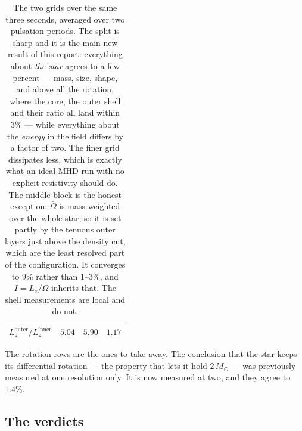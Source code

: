 \documentclass[11pt,a4paper]{article}
\newcommand{\Msun}{M_\odot}
\begin{document}
\begin{table}[h]
\begin{tabular}{lrrr}
$L_z^{\mathrm{outer}}/L_z^{\mathrm{inner}}$ & $5.04$ & $5.90$ & $1.17$ \\
\bottomrule
\end{tabular}
\caption{The two grids over the same three seconds, averaged over two
pulsation periods. The split is sharp and it is the main new result of this
report: everything about \emph{the star} agrees to a few percent --- mass,
size, shape, and above all the rotation, where the core, the outer shell and
their ratio all land within $3\%$ --- while everything about the \emph{energy}
in the field differs by a factor of two. The finer grid dissipates less, which
is exactly what an ideal-MHD run with no explicit resistivity should do.
The middle block is the honest exception: $\bar\Omega$ is mass-weighted over
the whole star, so it is set partly by the tenuous outer layers just above the
density cut, which are the least resolved part of the configuration. It
converges to $9\%$ rather than $1$--$3\%$, and $I = L_z/\bar\Omega$ inherits
that. The shell measurements are local and do not.}
\label{tab:window}
\end{table}

The rotation rows are the ones to take away. The conclusion that the star keeps
its differential rotation --- the property that lets it hold $2\,\Msun$ ---
was previously measured at one resolution only. It is now measured at two, and
they agree to $1.4\%$.

\subsection{The verdicts}
\end{document}
